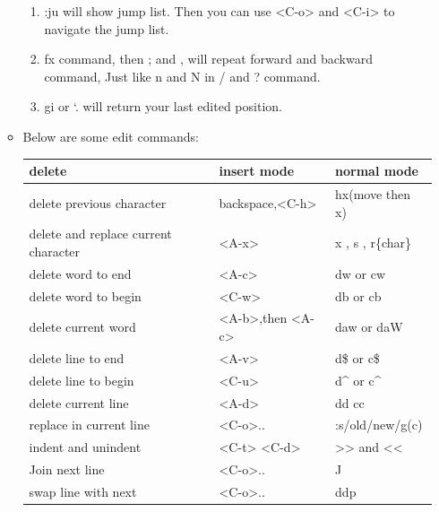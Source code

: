 \documentclass[a4paper,12pt,twoside]{book}
\begin{document}
\begin{itemize}
\begin{itemize}
\begin{enumerate}
		\item :ju will show jump list. Then you can use <C-o> and <C-i> to navigate the jump list. 

		\item fx command, then ; and , will repeat forward and backward command, Just like n and N in / and ? command.

		\item gi or `. will return your last edited position. 
\end{enumerate}

\item Below are some edit commands:
\begin{center}
		\begin{tabular}{p{}|p{}|p{}}
		\hline
		delete & insert mode & normal mode\\

   	    \hline 
		delete previous character & backspace,<C-h> & hx(move then x)  \\
		
	
		\hline 
		delete and replace current character & <A-x> & x , s , r\{char\}  \\
	
		\hline 
		delete word to end & <A-c> &dw or cw  \\
		
		\hline 
		delete word to begin & <C-w> &db or cb  \\

		\hline 
		delete current word &<A-b>,then <A-c> & daw or daW \\
		
		\hline 
		delete line to end & <A-v> & d\$ or c\$  \\
		
		\hline 
		delete line to begin & <C-u> & d\^{} or c\^{}  \\
		
		\hline 
		delete current line & <A-d> & dd cc \\

       \hline
	   replace in current line &<C-o>.. & :s/old/new/g(c) \\

	   \hline
		indent and unindent & <C-t> <C-d> & >> and << \\

	   \hline 
	   Join next line & <C-o>.. & J \\ 

	   \hline 
		swap line with next &<C-o>.. & ddp \\
	

\end{tabular}
\end{center}
\end{itemize}
\end{itemize}
\end{document}

